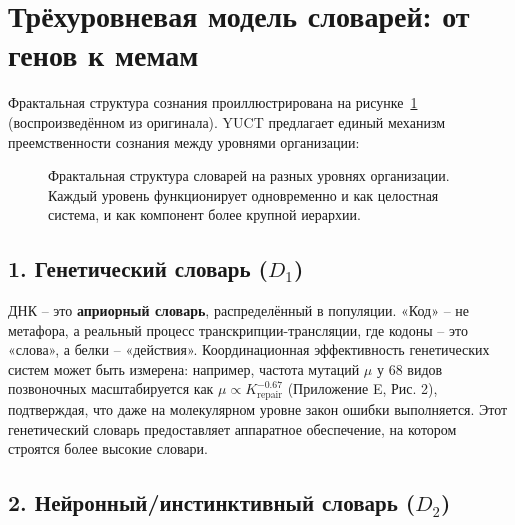 \documentclass[12pt,a4paper]{article}
\begin{document}
	\section{Трёхуровневая модель словарей: от генов к мемам}
	
	Фрактальная структура сознания проиллюстрирована на рисунке~\ref{fig:fractal_dict} (воспроизведённом из оригинала). YUCT предлагает единый механизм преемственности сознания между уровнями организации:
	
	\begin{figure}[htbp]
		\centering
		\caption{Фрактальная структура словарей на разных уровнях организации. Каждый уровень функционирует одновременно и как целостная система, и как компонент более крупной иерархии.}
		\label{fig:fractal_dict}
	\end{figure}
	
	\subsection{1. Генетический словарь ($D_1$)}
	
	ДНК – это \textbf{априорный словарь}, распределённый в популяции. «Код» – не метафора, а реальный процесс транскрипции-трансляции, где кодоны – это «слова», а белки – «действия». Координационная эффективность генетических систем может быть измерена: например, частота мутаций $\mu$ у 68 видов позвоночных масштабируется как $\mu \propto K_{\text{repair}}^{-0.67}$ (Приложение E, Рис. 2), подтверждая, что даже на молекулярном уровне закон ошибки выполняется. Этот генетический словарь предоставляет аппаратное обеспечение, на котором строятся более высокие словари.
	
	\subsection{2. Нейронный/инстинктивный словарь ($D_2$)}
	
\end{document}
